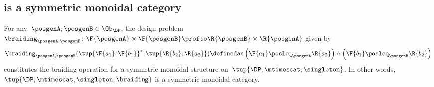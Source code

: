 \subsection{\DP is a symmetric monoidal category}
\begin{lemma}
  \label{lem:symmetricmonoidaldp}
  For any~$\posgenA,\posgenB \in\Ob_\DP$, the design problem~$\braiding_{\posgenA,\posgenB}\colon \F{\posgenA} \times \F{\posgenB} \profto \R{\posgenB} \times \R{\posgenA}$ given by
  \begin{equation}
    \braiding_{\posgenA,\posgenB}(\tup{\F{a_1},\F{b_1}}^*,\tup{\R{b_2},\R{a_2}})\definedas \left(\F{a_1}\posleq_\posgenA \R{a_2}\right)\wedge \left(\F{b_1}\posleq_\posgenB \R{b_2}\right)
  \end{equation}
  constitutes the braiding operation for a symmetric monoidal structure on~$\tup{\DP,\mtimescat,\singleton}$.
  In other words,~$\tup{\DP, \mtimescat, \singleton, \braiding}$ is a symmetric monoidal category.
\end{lemma}

